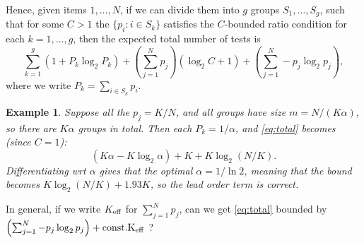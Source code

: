 \documentclass[11pt]{article}
\newtheorem{example}{Example}[section]
\newcommand{\eff}{{\rm eff}}
\begin{document}
Hence, given items $1, \ldots, N$, if we can divide them into $g$ groups $S_1, \ldots, S_g$, such that for some $C > 1$ the $\{ p_i : i \in S_k \}$ satisfies the $C$-bounded ratio 
condition for each $k = 1, \ldots, g$, then the expected total number of tests is
\begin{equation} \label{eq:total}
 \sum_{k=1}^g (1 + P_k \log_2 P_k) + \left( \sum_{j=1}^N p_j \right) (\log_2 C + 1) + \left( \sum_{j=1}^N -p_j \log_2 p_j \right),\end{equation}
where we write $P_k = \sum_{i \in S_k} p_i$.

\begin{example}
Suppose all the $p_j = K/N$, and all groups have size $m = N/(K \alpha)$, so there are $K \alpha$ groups in total.
Then each $P_k = 1/\alpha$, and \eqref{eq:total} becomes (since $C = 1$):
$$ \left( K \alpha - K \log_2 \alpha \right) + K + K \log_2 (N/K).$$ 
Differentiating wrt $\alpha$ gives that the optimal $\alpha = 1/\ln 2$, meaning that the bound becomes $K \log_2(N/K) + 1.93K$, so the lead order term is correct.
\end{example}

In general, if we write $K_{\eff}$ for $\sum_{j=1}^N p_j$, can we get \eqref{eq:total} bounded by $\left( \sum_{j=1}^N -p_j \log_2 p_j \right) + \rm{const.} K_{\eff}$ ?
\end{document}
